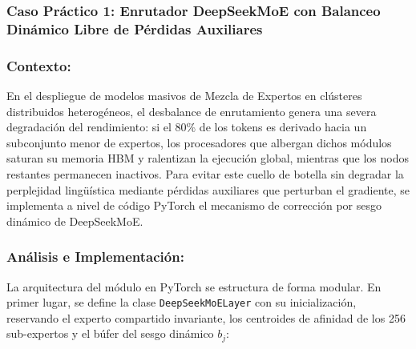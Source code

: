 \subsubsection{Caso Práctico 1: Enrutador DeepSeekMoE con Balanceo Dinámico Libre de Pérdidas Auxiliares}

\subsubsection*{Contexto:}
En el despliegue de modelos masivos de Mezcla de Expertos en clústeres distribuidos heterogéneos, el desbalance de enrutamiento genera una severa degradación del rendimiento: si el 80\% de los tokens es derivado hacia un subconjunto menor de expertos, los procesadores que albergan dichos módulos saturan su memoria HBM y ralentizan la ejecución global, mientras que los nodos restantes permanecen inactivos. Para evitar este cuello de botella sin degradar la perplejidad lingüística mediante pérdidas auxiliares que perturban el gradiente, se implementa a nivel de código PyTorch el mecanismo de corrección por sesgo dinámico de DeepSeekMoE.

\subsubsection*{Análisis e Implementación:}
La arquitectura del módulo en PyTorch se estructura de forma modular. En primer lugar, se define la clase \texttt{DeepSeekMoELayer} con su inicialización, reservando el experto compartido invariante, los centroides de afinidad de los 256 sub-expertos y el búfer del sesgo dinámico $b_j$:

